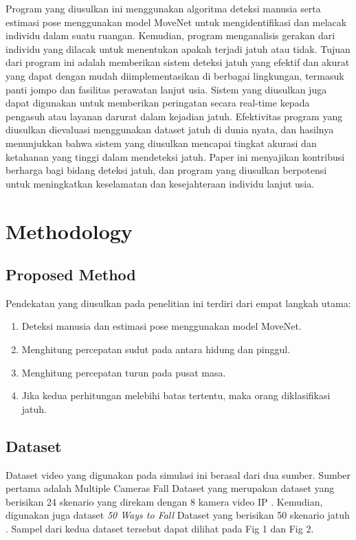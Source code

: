 \documentclass[conference]{IEEEtran}
\begin{document}
Program yang diusulkan ini menggunakan algoritma deteksi manusia serta estimasi pose menggunakan model MoveNet untuk mengidentifikasi dan melacak individu dalam suatu ruangan. Kemudian, program menganalisis gerakan dari individu yang dilacak untuk menentukan apakah terjadi jatuh atau tidak. Tujuan dari program ini adalah memberikan sistem deteksi jatuh yang efektif dan akurat yang dapat dengan mudah diimplementasikan di berbagai lingkungan, termasuk panti jompo dan fasilitas perawatan lanjut usia. Sistem yang diusulkan juga dapat digunakan untuk memberikan peringatan secara real-time kepada pengasuh atau layanan darurat dalam kejadian jatuh. Efektivitas program yang diusulkan dievaluasi menggunakan dataset jatuh di dunia nyata, dan hasilnya menunjukkan bahwa sistem yang diusulkan mencapai tingkat akurasi dan ketahanan yang tinggi dalam mendeteksi jatuh. Paper ini menyajikan kontribusi berharga bagi bidang deteksi jatuh, dan program yang diusulkan berpotensi untuk meningkatkan keselamatan dan kesejahteraan individu lanjut usia.

\section{Methodology}

\subsection{Proposed Method}
Pendekatan yang diusulkan pada penelitian ini terdiri dari empat langkah utama:
\begin{enumerate}
    \item Deteksi manusia dan estimasi pose menggunakan model MoveNet.
    \item Menghitung percepatan sudut pada antara hidung dan pinggul.
    \item Menghitung percepatan turun pada pusat masa.
    \item Jika kedua perhitungan melebihi batas tertentu, maka orang diklasifikasi jatuh.
\end{enumerate}

\subsection{Dataset}
Dataset video yang digunakan pada simulasi ini berasal dari dua sumber. Sumber pertama adalah Multiple Cameras Fall Dataset yang merupakan dataset yang berisikan 24 skenario yang direkam dengan 8 kamera video IP \cite{dataset1}. Kemudian, digunakan juga dataset \textit{50 Ways to Fall} Dataset yang berisikan 50 skenario jatuh \cite{dataset2}. Sampel dari kedua dataset tersebut dapat dilihat pada Fig 1 dan Fig 2.
\end{document}
